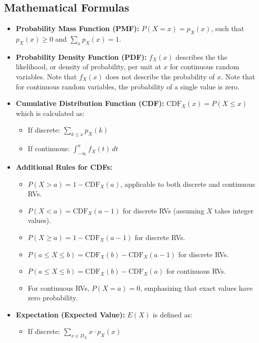 \documentclass{article}
\begin{document}
\subsection*{Mathematical Formulas}
\begin{itemize}
    \item \textbf{Probability Mass Function (PMF):} \( P(X = x) = p_X(x) \), such that \( p_X(x) \geq 0 \) and \( \sum_x p_X(x) = 1 \).
    \item \textbf{Probability Density Function (PDF):} \( f_X(x) \) describes the the likelihood, or density of probability, per unit at \( x \) for continuous random variables. Note that $f_X(x)$ does not describe the probability of $x$. Note that for continuous random variables, the probability of a single value is zero.
    \item \textbf{Cumulative Distribution Function (CDF):} \( \text{CDF}_X(x) = P(X \leq x) \) which is calculated as:
        \begin{itemize}
            \item If discrete: \( \sum_{k \leq x} p_X(k) \)
            \item If continuous: \( \int_{-\infty}^x f_X(t) \, dt \)
        \end{itemize}
    \item \textbf{Additional Rules for CDFs:}
        \begin{itemize}
            \item \( P(X > a) = 1 - \text{CDF}_X(a) \), applicable to both discrete and continuous RVs.
            \item \( P(X < a) = \text{CDF}_X(a-1) \) for discrete RVs (assuming \(X\) takes integer values).
            \item \( P(X \geq a) = 1 - \text{CDF}_X(a-1) \) for discrete RVs.
            \item \( P(a \leq X \leq b) = \text{CDF}_X(b) - \text{CDF}_X(a-1) \) for discrete RVs.
            \item \( P(a \leq X \leq b) = \text{CDF}_X(b) - \text{CDF}_X(a) \) for continuous RVs.
            \item For continuous RVs, \( P(X = a) = 0 \), emphasizing that exact values have zero probability.
        \end{itemize}
    \item \textbf{Expectation (Expected Value):} \( E(X) \) is defined as:
        \begin{itemize}
            \item If discrete: \( \sum_{x \in D_X} x \cdot p_X(x) \)

\end{itemize}
\end{itemize}
\end{document}
